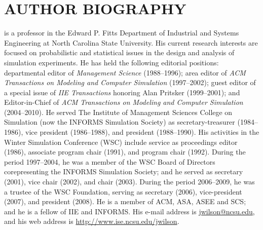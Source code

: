 \documentclass{wscpaperproc}
\theoremstyle{wsc}
\begin{document}
\section*{AUTHOR BIOGRAPHY}
 
is a professor in the Edward P. Fitts Department of Industrial and Systems
Engineering at North Carolina State University.  His current research
interests are focused on probabilistic and statistical issues in the design
and analysis of simulation experiments.  He has held the following
editorial positions: departmental editor of \textit{Management Science}
(1988--1996); area editor of \textit{ACM Transactions on Modeling and
Computer Simulation} (1997--2002); guest editor of a special issue of
\textit{IIE Transactions} honoring Alan Pritsker (1999--2001); and
Editor-in-Chief of \textit{ACM Transactions on Modeling and Computer
Simulation} (2004--2010).  He served The Institute of Management Sciences
College on Simulation (now the INFORMS Simulation Society) as
secretary-treasurer (1984--1986), vice president (1986--1988), and
president (1988--1990).  His activities in the Winter Simulation Conference
(WSC) include service as proceedings editor
(1986), associate program chair (1991), and program chair (1992).  During
the period 1997--2004, he was a member of the WSC Board of Directors
corepresenting the INFORMS Simulation Society; and he served as secretary
(2001), vice chair (2002), and chair (2003).  During the period 2006--2009,
he was a trustee of the WSC Foundation, serving as secretary (2006),
vice-president (2007), and president (2008).  He is a member of ACM, ASA,
ASEE and SCS; and he is a fellow of IIE and INFORMS\@.  His e-mail address
is
\href{mailto:jwilson@ncsu.edu}{jwilson@ncsu.edu}\textcolor{black}{,} and his web address is 
\href{http://www.ise.ncsu.edu/jwilson}{http://www.ise.ncsu.edu/jwilson}\textcolor{black}{.}
\end{document}
